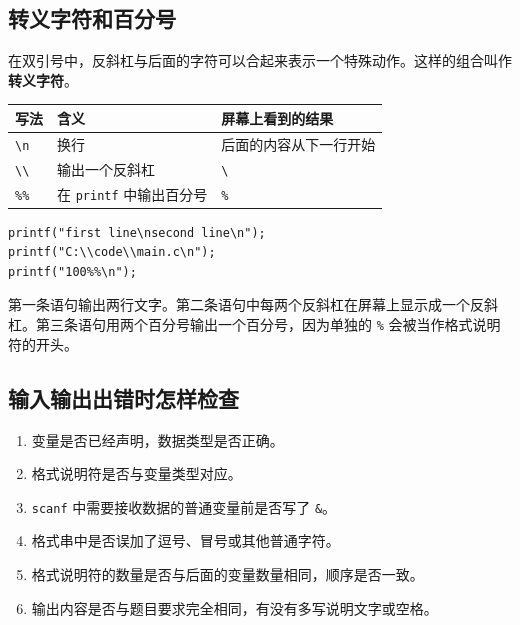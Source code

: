 \documentclass[UTF8,zihao=-4,fontset=windows]{ctexart}
\newcommand{\term}[1]{\textbf{\color{navy}#1}}
\begin{document}
\subsection{转义字符和百分号}

在双引号中，反斜杠与后面的字符可以合起来表示一个特殊动作。这样的组合叫作\term{转义字符}。

\begin{center}
\begin{tabularx}{0.84\textwidth}{>{\centering\arraybackslash}p{2.5cm} X X}
\toprule
写法 & 含义 & 屏幕上看到的结果 \\
\midrule
\texttt{\textbackslash n} & 换行 & 后面的内容从下一行开始 \\
\texttt{\textbackslash\textbackslash} & 输出一个反斜杠 & \texttt{\textbackslash} \\
\texttt{\%\%} & 在 \texttt{printf} 中输出百分号 & \texttt{\%} \\
\bottomrule
\end{tabularx}
\end{center}

\begin{lstlisting}[style=cstyle]
printf("first line\nsecond line\n");
printf("C:\\code\\main.c\n");
printf("100%%\n");
\end{lstlisting}

第一条语句输出两行文字。第二条语句中每两个反斜杠在屏幕上显示成一个反斜杠。第三条语句用两个百分号输出一个百分号，因为单独的 \verb|%| 会被当作格式说明符的开头。

\subsection{输入输出出错时怎样检查}

\begin{enumerate}
  \item 变量是否已经声明，数据类型是否正确。
  \item 格式说明符是否与变量类型对应。
  \item \verb|scanf| 中需要接收数据的普通变量前是否写了 \verb|&|。
  \item 格式串中是否误加了逗号、冒号或其他普通字符。
  \item 格式说明符的数量是否与后面的变量数量相同，顺序是否一致。
  \item 输出内容是否与题目要求完全相同，有没有多写说明文字或空格。
\end{enumerate}
\end{document}
